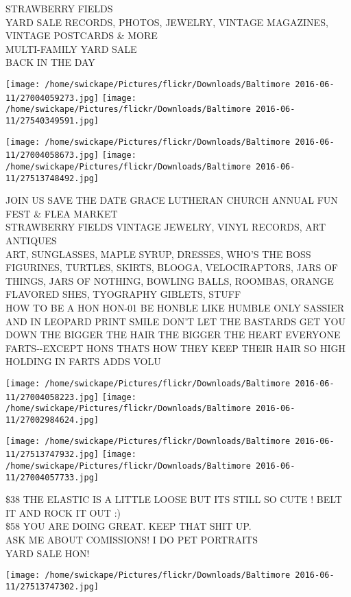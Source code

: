 \documentclass[10pt,letterpaper]{article}
\begin{document}
STRAWBERRY FIELDS\\
YARD SALE RECORDS, PHOTOS, JEWELRY, VINTAGE MAGAZINES, VINTAGE POSTCARDS \& MORE\\
MULTI{-}FAMILY YARD SALE\\
BACK IN THE DAY
\pagebreak

\texttt{[image: /home/swickape/Pictures/flickr/Downloads/Baltimore 2016-06-11/27004059273.jpg]}
\texttt{[image: /home/swickape/Pictures/flickr/Downloads/Baltimore 2016-06-11/27540349591.jpg]}

\texttt{[image: /home/swickape/Pictures/flickr/Downloads/Baltimore 2016-06-11/27004058673.jpg]}
\texttt{[image: /home/swickape/Pictures/flickr/Downloads/Baltimore 2016-06-11/27513748492.jpg]}

JOIN US SAVE THE DATE GRACE LUTHERAN CHURCH ANNUAL FUN FEST \& FLEA MARKET\\
STRAWBERRY FIELDS VINTAGE JEWELRY, VINYL RECORDS, ART ANTIQUES\\
ART, SUNGLASSES, MAPLE SYRUP, DRESSES, WHO'S THE BOSS FIGURINES, TURTLES, SKIRTS, BLOOGA, VELOCIRAPTORS, JARS OF THINGS, JARS OF NOTHING, BOWLING BALLS, ROOMBAS, ORANGE FLAVORED SHES, TYOGRAPHY GIBLETS, STUFF\\
HOW TO BE A HON HON{-}01 BE HONBLE LIKE HUMBLE ONLY SASSIER AND IN LEOPARD PRINT SMILE DON'T LET THE BASTARDS GET YOU DOWN THE BIGGER THE HAIR THE BIGGER THE HEART EVERYONE FARTS{-}{-}EXCEPT HONS THATS HOW THEY KEEP THEIR HAIR SO HIGH HOLDING IN FARTS ADDS VOLU
\pagebreak

\texttt{[image: /home/swickape/Pictures/flickr/Downloads/Baltimore 2016-06-11/27004058223.jpg]}
\texttt{[image: /home/swickape/Pictures/flickr/Downloads/Baltimore 2016-06-11/27002984624.jpg]}

\texttt{[image: /home/swickape/Pictures/flickr/Downloads/Baltimore 2016-06-11/27513747932.jpg]}
\texttt{[image: /home/swickape/Pictures/flickr/Downloads/Baltimore 2016-06-11/27004057733.jpg]}

\$38 THE ELASTIC IS A LITTLE LOOSE BUT ITS STILL SO CUTE !  BELT IT AND ROCK IT OUT :)\\
\$58 YOU ARE DOING GREAT.  KEEP THAT SHIT UP.\\
ASK ME ABOUT COMISSIONS!  I DO PET PORTRAITS\\
YARD SALE HON!
\pagebreak

\texttt{[image: /home/swickape/Pictures/flickr/Downloads/Baltimore 2016-06-11/27513747302.jpg]}
\end{document}

